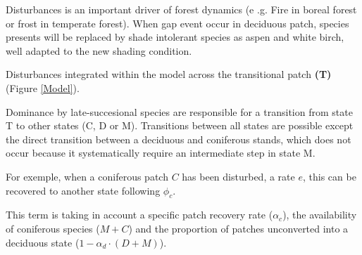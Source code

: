 
Disturbances is an important driver of forest dynamics (e .g. Fire in boreal
forest or frost in temperate forest). When gap event occur in deciduous patch,
species presents will be replaced by shade intolerant species as aspen and
white birch, well adapted to the new shading condition.


Disturbances  integrated within the model across the transitional patch
\textbf{(T)} (Figure \ref{Model}).


Dominance by late-succesional species are responsible for a transition from
state T to other states (C, D or M). Transitions between all states are
possible  except the direct transition between a deciduous and coniferous
stands, which does not occur because it systematically require an intermediate
step in state M.



For exemple, when a coniferous patch $C$ has been disturbed, a rate $e$, this can be
recovered to another state following $\phi_c$. 


This term is taking in account a specific patch recovery rate ($\alpha_{c}$),
the availability of coniferous species ($M+C$) and the proportion of patches
unconverted into a deciduous state ($1- \alpha_d \cdot (D +M)$).


